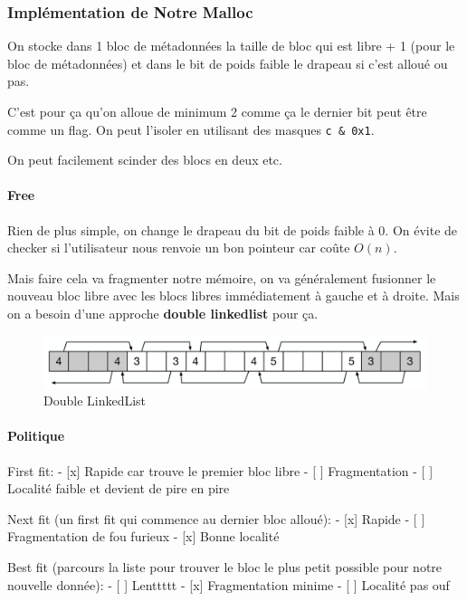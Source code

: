 \subsubsection{Implémentation de Notre
Malloc}\label{impluxe9mentation-de-notre-malloc}

On stocke dans 1 bloc de métadonnées la taille de bloc qui est libre + 1
(pour le bloc de métadonnées) et dans le bit de poids faible le drapeau
si c'est alloué ou pas.

C'est pour ça qu'on alloue de minimum 2 comme ça le dernier bit peut
être comme un flag. On peut l'isoler en utilisant des masques
\texttt{c\ \&\ 0x1}.

On peut facilement scinder des blocs en deux etc.

\paragraph{Free}\label{free}

Rien de plus simple, on change le drapeau du bit de poids faible à 0. On
évite de checker si l'utilisateur nous renvoie un bon pointeur car coûte
\(O(n)\).

Mais faire cela va fragmenter notre mémoire, on va généralement
fusionner le nouveau bloc libre avec les blocs libres immédiatement à
gauche et à droite. Mais on a besoin d'une approche \textbf{double
linkedlist} pour ça.

\begin{figure}
\centering
\includegraphics{image-50.png}
\caption{Double LinkedList}
\end{figure}

\paragraph{Politique}\label{politique}

First fit: - {[}x{]} Rapide car trouve le premier bloc libre - {[} {]}
Fragmentation - {[} {]} Localité faible et devient de pire en pire

Next fit (un first fit qui commence au dernier bloc alloué): - {[}x{]}
Rapide - {[} {]} Fragmentation de fou furieux - {[}x{]} Bonne localité

Best fit (parcours la liste pour trouver le bloc le plus petit possible
pour notre nouvelle donnée): - {[} {]} Lenttttt - {[}x{]} Fragmentation
minime - {[} {]} Localité pas ouf

